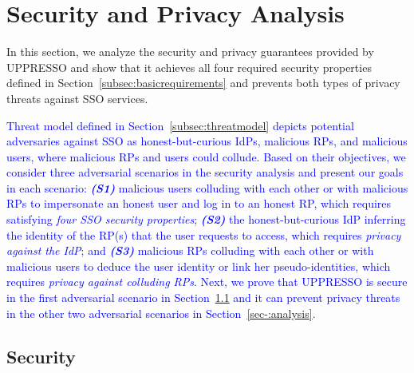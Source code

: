 \section{Security and Privacy Analysis}
\label{sec:analysis}
In this section, we analyze the security and privacy guarantees provided by UPPRESSO and show that it achieves all four required security properties defined in Section~\ref{subsec:basicrequirements} and prevents both types of privacy threats against SSO services.

\label{adver-model}
\textcolor{blue}{Threat model defined in Section~\ref{subsec:threatmodel} depicts potential adversaries against SSO as honest-but-curious IdPs, malicious RPs, and malicious users, where malicious RPs and users could collude. Based on their objectives, we consider three adversarial scenarios in the security analysis and present our goals in each scenario: {\bf \emph{(S1)}} malicious users colluding with each other or with malicious RPs to impersonate an honest user and log in to an honest RP, which requires satisfying {\em four SSO security properties}; {\bf \emph{(S2)}} the honest-but-curious IdP inferring the identity of the RP(s) that the user requests to access, which requires {\em privacy against the IdP}; and {\bf \emph{(S3)}} malicious RPs colluding with each other or with malicious users to deduce the user identity or link her pseudo-identities, which requires {\em privacy against colluding RPs}. Next, we prove that UPPRESSO is secure in the first adversarial scenario in Section~\ref{analysis-security} and it can prevent privacy threats in the other two adversarial scenarios in Section~\ref{sec-:analysis}.}


\subsection{Security}
\label{analysis-security}

